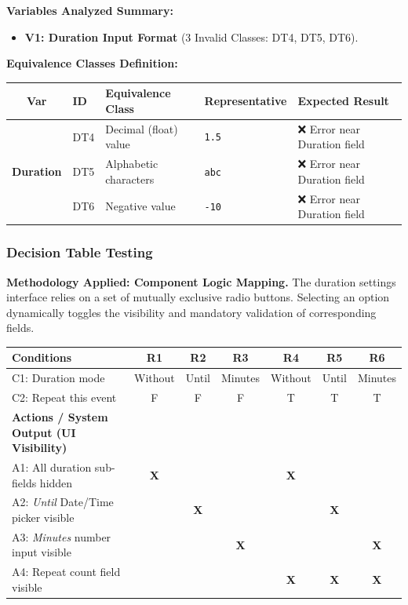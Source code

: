 \documentclass[twoside,final]{hcmut-report}
\begin{document}
\textbf{Variables Analyzed Summary:}
\begin{itemize}
    \item \textbf{V1: Duration Input Format} (3 Invalid Classes: DT4, DT5, DT6).
\end{itemize}

\vspace{0.3cm}
\noindent\textbf{Equivalence Classes Definition:}
\begin{table}[H]
\centering
\renewcommand{\arraystretch}{1.2}
\begin{tabularx}{\textwidth}{|c|l|X|l|X|}
\hline
\textbf{Var} & \textbf{ID} & \textbf{Equivalence Class} & \textbf{Representative} & \textbf{Expected Result} \\ \hline
\multirow{3}{*}{\textbf{Duration}}
& DT4 & Decimal (float) value & \texttt{1.5} & ❌ Error near Duration field \\ \cline{2-5}
& DT5 & Alphabetic characters & \texttt{abc} & ❌ Error near Duration field \\ \cline{2-5}
& DT6 & Negative value & \texttt{-10} & ❌ Error near Duration field \\ \hline
\end{tabularx}
\end{table}

\subsubsection{Decision Table Testing}
\textbf{Methodology Applied: Component Logic Mapping.} 
The duration settings interface relies on a set of mutually exclusive radio buttons. Selecting an option dynamically toggles the visibility and mandatory validation of corresponding fields.

\begin{table}[H]
\centering
\renewcommand{\arraystretch}{1.2}
\begin{tabularx}{\textwidth}{|>{\raggedright\arraybackslash}X|c|c|c|c|c|c|}
\hline
\textbf{Conditions} & \textbf{R1} & \textbf{R2} & \textbf{R3} & \textbf{R4} & \textbf{R5} & \textbf{R6} \\ \hline
C1: Duration mode & Without & Until & Minutes & Without & Until & Minutes \\ \hline
C2: Repeat this event & F & F & F & T & T & T \\ \hline
\hline
\textbf{Actions / System Output (UI Visibility)} & & & & & & \\ \hline
A1: All duration sub-fields hidden & \textbf{X} & & & \textbf{X} & & \\ \hline
A2: \textit{Until} Date/Time picker visible & & \textbf{X} & & & \textbf{X} & \\ \hline
A3: \textit{Minutes} number input visible & & & \textbf{X} & & & \textbf{X} \\ \hline
A4: Repeat count field visible & & & & \textbf{X} & \textbf{X} & \textbf{X} \\ \hline
\end{tabularx}
\end{table}
\end{document}
